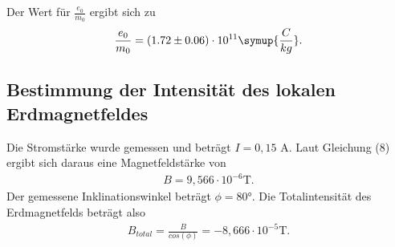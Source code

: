 Der Wert für $\frac{e_0}{m_0}$ ergibt sich zu
\begin{align*}
\frac{e_0}{m_0} = (1.72 \pm 0.06) \cdot 10^{11} \symup{\frac{C}{kg}}.
\end{align*}


\subsection{Bestimmung der Intensität des lokalen Erdmagnetfeldes}
Die Stromstärke wurde gemessen und beträgt $I = 0,15$ \si{\ampere}.
Laut Gleichung (8) ergibt sich daraus eine Magnetfeldstärke von
\begin{align*}
    B = 9,566 \cdot 10^{-6} \si{\tesla}.
\end{align*}
Der gemessene Inklinationswinkel beträgt $\phi = 80°$.
Die Totalintensität des Erdmagnetfelds beträgt also
\begin{align*}
    B_{total} = \frac{B}{cos(\phi)} = -8,666 \cdot 10^{-5} \si{\tesla}.
\end{align*}

